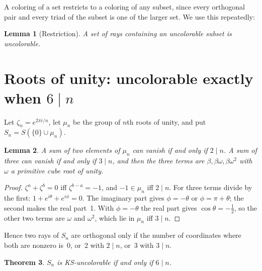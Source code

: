 \documentclass[11pt,a4paper]{article}
\newtheorem{theorem}{Theorem}
\newtheorem{lemma}[theorem]{Lemma}
\theoremstyle{remark}
\begin{document}
A coloring of a set restricts to a coloring of any subset, since every orthogonal pair and every
triad of the subset is one of the larger set.  We use this repeatedly:

\begin{lemma}[Restriction]\label{lem:restrict}
A set of rays containing an uncolorable subset is uncolorable.
\end{lemma}

\section{Roots of unity: uncolorable exactly when $6\mid n$}

Let $\zeta_n=e^{2\pi i/n}$, let $\mu_n$ be the group of $n$th roots of unity, and put
$S_n=S(\{0\}\cup\mu_n)$.

\begin{lemma}\label{lem:sums}
A sum of two elements of $\mu_n$ can vanish if and only if $2\mid n$.  A sum of three can vanish
if and only if $3\mid n$, and then the three terms are $\beta,\beta\omega,\beta\omega^2$ with
$\omega$ a primitive cube root of unity.
\end{lemma}

\begin{proof}
$\zeta^a+\zeta^b=0$ iff $\zeta^{b-a}=-1$, and $-1\in\mu_n$ iff $2\mid n$.  For three terms divide
by the first: $1+e^{i\theta}+e^{i\phi}=0$.  The imaginary part gives $\phi=-\theta$ or
$\phi=\pi+\theta$; the second makes the real part~1.  With $\phi=-\theta$ the real part gives
$\cos\theta=-\tfrac12$, so the other two terms are $\omega$ and $\omega^2$, which lie in $\mu_n$
iff $3\mid n$.
\end{proof}

Hence two rays of $S_n$ are orthogonal only if the number of coordinates where both are nonzero
is~0, or~2 with $2\mid n$, or~3 with $3\mid n$.

\begin{theorem}\label{thm:A}
$S_n$ is KS-uncolorable if and only if $6\mid n$.
\end{theorem}
\end{document}
